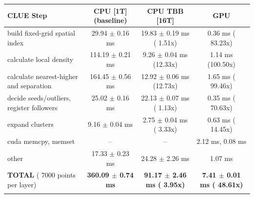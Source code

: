     \begin{tabular}{l|c|c|c}
    \hline
    CLUE Step                                 & CPU [1T] (baseline)         & CPU TBB [16T]                         & GPU                       \\ \hline
    build fixed-grid spatial index            &  29.94 $\pm$  0.16 ms       &  19.83 $\pm$  0.19 ms ( 1.51x)        &   0.36 ms ( 83.23x)       \\
    calculate local density                   & 114.19 $\pm$  0.21 ms       &   9.26 $\pm$  0.04 ms (12.33x)        &   1.14 ms (100.50x)       \\
    calculate nearest-higher and separation   & 164.45 $\pm$  0.56 ms       &  12.92 $\pm$  0.06 ms (12.73x)        &   1.65 ms ( 99.46x)       \\
    decide seeds/outliers, register followers &  25.02 $\pm$  0.16 ms       &  22.13 $\pm$  0.07 ms ( 1.13x)        &   0.35 ms ( 70.63x)       \\
    expand clusters                           &   9.16 $\pm$  0.04 ms       &   2.75 $\pm$  0.04 ms ( 3.33x)        &   0.63 ms ( 14.45x)       \\ \hline
    cuda memcpy, memset                       & --                          & --                                    &   2.12 ms,   0.08 ms      \\
    other                                     &  17.33 $\pm$  0.23 ms       &  24.28 $\pm$  2.26 ms                 &   1.07 ms                 \\ \hline
    \textbf{TOTAL} ( 7000 points per layer)   & \textbf{360.09 $\pm$  0.74 ms} & \textbf{ 91.17 $\pm$  2.46 ms ( 3.95x)} & \textbf{  7.41 $\pm$  0.01 ms ( 48.61x)}  \\
    \hline
    \multicolumn{4}{c}{}
    \end{tabular}
    \linebreak


